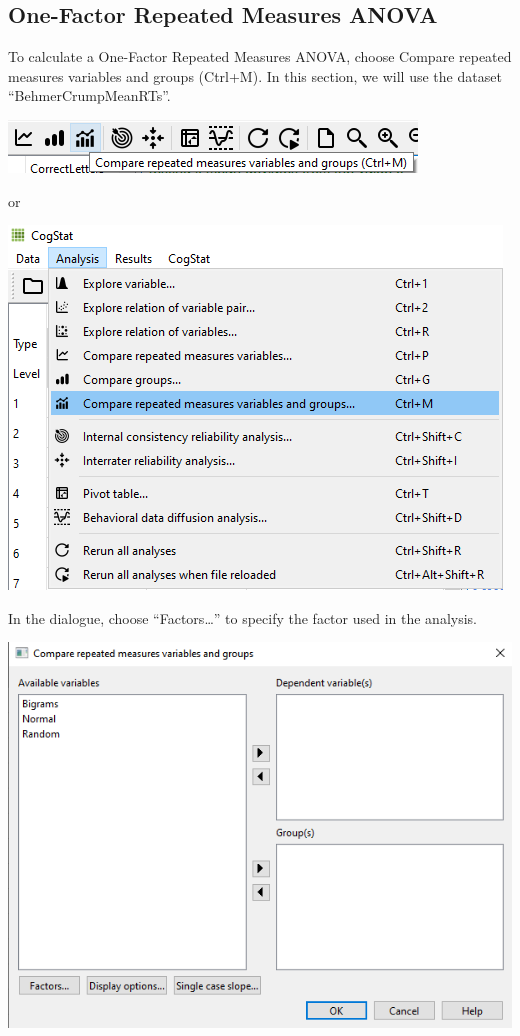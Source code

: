 \documentclass[
]{book}
\begin{document}
\hypertarget{one-factor-repeated-measures-anova}{%
\subsection{One-Factor Repeated Measures ANOVA}\label{one-factor-repeated-measures-anova}}

To calculate a One-Factor Repeated Measures ANOVA, choose Compare repeated measures variables and groups (Ctrl+M). In this section, we will use the dataset ``BehmerCrumpMeanRTs''.

\includegraphics{img/ch9/9.4CRMVAG_icon.png}

or

\includegraphics{img/ch9/9.4CRMVAG_menu.png}

In the dialogue, choose ``Factors\ldots{}'' to specify the factor used in the analysis.

\includegraphics{img/ch9/9.4CRMVAG_window.png}
\end{document}
